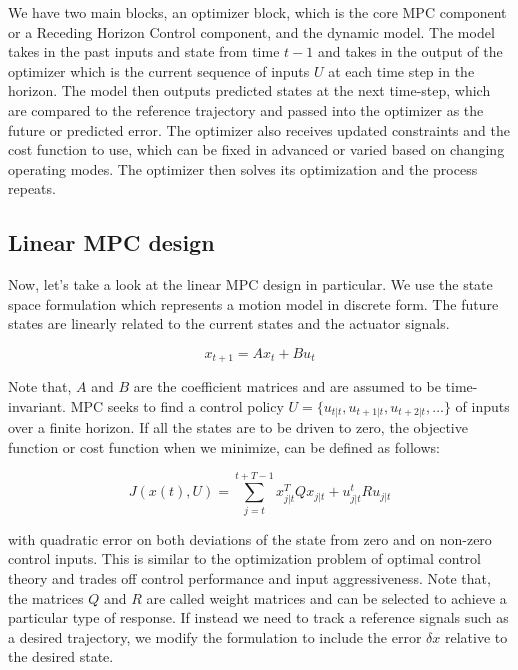 We have two main blocks,
an optimizer block, which is the core MPC component or a Receding Horizon
Control component, and the dynamic model. The model takes in
the past inputs and state from time $t-1$ and takes in the output of the optimizer which is the current sequence of inputs $U$
at each time step in the horizon. The model then outputs predicted
states at the next time-step, which are compared to
the reference trajectory and passed into the optimizer as
the future or predicted error. The optimizer also receives updated constraints and
the cost function to use, which can be fixed in advanced or varied based on changing
operating modes. The optimizer then solves its optimization and
the process repeats. 

\subsection{Linear MPC design}
\label{linear_mpc_design}

Now, let's take a look at
the linear MPC design in particular. We use the state space
formulation which represents a motion
model in discrete form. The future states
are linearly related to the current states and
the actuator signals. 

\begin{equation}
x_{t+1} = Ax_t + Bu_t
\end{equation}

Note that, $A$ and $B$ are the coefficient matrices and are
assumed to be time-invariant. MPC seeks to find a control policy $ U = \{u_{t|t}, u_{t+1|t}, u_{t+2|t}, \ldots \}$ of inputs
over a finite horizon. If all the states are
to be driven to zero, the objective function or cost
function when we minimize, can be defined as follows:

\begin{equation}
J(x(t) , U) = \sum_{j=t}^{t+T-1} x_{j|t}^TQx_{j|t} + u_{j|t}^tRu_{j|t}
\end{equation}

with quadratic error on both deviations of the state from zero and on non-zero control inputs. This is similar to
the optimization problem of optimal control theory and trades off control performance and
input aggressiveness. Note that, the matrices $Q$
and $R$ are called weight matrices and can be selected to achieve a particular
type of response. If instead we need to track a reference signals such
as a desired trajectory, we modify the formulation to include the error $\delta x$ relative
to the desired state. 

